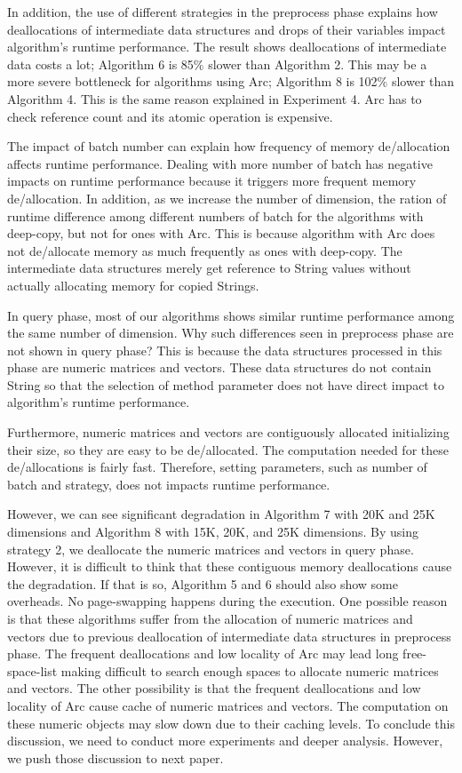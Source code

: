 In addition, the use of different strategies in the preprocess phase explains how deallocations of intermediate data structures and drops of their variables impact algorithm's runtime performance.
The result shows deallocations of intermediate data costs a lot; Algorithm 6 is 85\% slower than Algorithm 2.
This may be a more severe bottleneck for algorithms using Arc; Algorithm 8 is 102\% slower than Algorithm 4.
This is the same reason explained in Experiment 4. 
Arc has to check reference count and its atomic operation is expensive. 

The impact of batch number can explain how frequency of memory de/allocation affects runtime performance. 
Dealing with more number of batch has negative impacts on runtime performance because it triggers more frequent memory de/allocation.
In addition, as we increase the number of dimension, the ration of runtime difference among different numbers of batch for the algorithms with deep-copy, but not for ones with Arc.
This is because algorithm with Arc does not de/allocate memory as much frequently as ones with deep-copy.
The intermediate data structures merely get reference to String values without actually allocating memory for copied Strings.

In query phase, most of our algorithms shows similar runtime performance among the same number of dimension. 
Why such differences seen in preprocess phase are not shown in query phase? This is because the data structures processed in this phase are numeric matrices and vectors. 
These data structures do not contain String so that the selection of method parameter does not have direct impact to algorithm's runtime performance.

Furthermore, numeric matrices and vectors are contiguously allocated initializing their size, so they are easy to be de/allocated. 
The computation needed for these de/allocations is fairly fast. Therefore, setting parameters, such as number of batch and strategy, does not impacts runtime performance.

However, we can see significant degradation in Algorithm 7 with 20K and 25K dimensions and Algorithm 8 with 15K, 20K, and 25K dimensions. 
By using strategy 2, we deallocate the numeric matrices and vectors in query phase. However, it is difficult to think that these contiguous memory deallocations cause the degradation. 
If that is so, Algorithm 5 and 6 should also show some overheads. No page-swapping happens during the execution. 
One possible reason is that these algorithms suffer from the allocation of numeric matrices and vectors due to previous deallocation of intermediate data structures in preprocess phase. 
The frequent deallocations and low locality of Arc may lead long free-space-list making difficult to search enough spaces to allocate numeric matrices and vectors.
The other possibility is that the frequent deallocations and low locality of Arc cause cache of numeric matrices and vectors. 
The computation on these numeric objects may slow down due to their caching levels. 
To conclude this discussion, we need to conduct more experiments and deeper analysis. 
However, we push those discussion to next paper.

